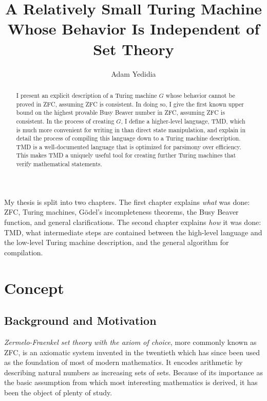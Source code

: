 \documentclass{report}
\begin{document}
\title{A Relatively Small Turing Machine Whose Behavior Is Independent of Set Theory}
\author{Adam Yedidia}

\maketitle

\begin{abstract}

I present an explicit description of a Turing machine $G$ whose behavior cannot be proved in ZFC, assuming ZFC is consistent. In doing so, I give the first known upper bound on the highest provable Busy Beaver number in ZFC, assuming ZFC is consistent. In the process of creating $G$, I define a higher-level language, TMD, which is much more convenient for writing in than direct state manipulation, and explain in detail the process of compiling this language down to a Turing machine description. TMD is a well-documented language that is optimized for parsimony over efficiency. This makes TMD a uniquely useful tool for creating further Turing machines that verify mathematical statements. 

\end{abstract}

My thesis is split into two chapters. The first chapter explains \emph{what} was done: ZFC, Turing machines, G\"{o}del's incompleteness theorems, the Busy Beaver function, and general clarifications. The second chapter explains \emph{how} it was done: TMD, what intermediate steps are contained between the high-level language and the low-level Turing machine description, and the general algorithm for compilation.

\chapter{Concept}

\section{Background and Motivation \label{sec:background}}

\emph{Zermelo-Fraenkel set theory with the axiom of choice}, more commonly known as ZFC, is an axiomatic system invented in the twentieth which has since been used as the foundation of most of modern mathematics. It encodes arithmetic by describing natural numbers as increasing sets of sets. Because of its importance as the basic assumption from which most interesting mathematics is derived, it has been the object of plenty of study. \\
\end{document}
